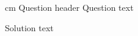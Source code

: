 \documentclass{exam}
\begin{document}
	\begin{questions}
		
		 cm \question Question header \vskip 0.5cm
		Question text
		
		\begin{solution}
			Solution text
		\end{solution}
		
	\end{questions}
\end{document}
